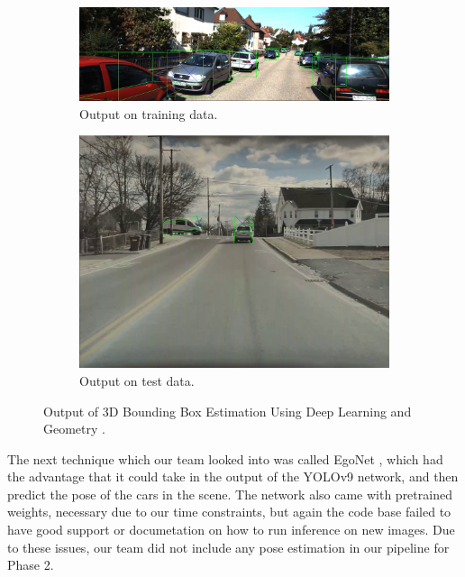 \begin{figure}
    \centering
    \begin{subfigure}{0.95\linewidth}
        \centering
        \includegraphics[width=\textwidth]{images/car_pose_train.png}
        \caption{Output on training data.}
        \label{fig:3DBoxEstimation_output_trained}
    \end{subfigure}
    \begin{subfigure}{0.95\linewidth}
        \centering
        \includegraphics[width=\textwidth]{images/car_pose.png}
        \caption{Output on test data.}
        \label{fig:3DBoxEstimation_output_test}
    \end{subfigure}
    \caption{Output of 3D Bounding Box Estimation Using Deep Learning and Geometry \cite{3DBoxEstimation}.}
\end{figure}

The next technique which our team looked into was called EgoNet \cite{EgoNet}, which had the advantage that it could take in the output of the YOLOv9 network, and then predict the pose of the cars in the scene. The network also came with pretrained weights, necessary due to our time constraints, but again the code base failed to have good support or documetation on how to run inference on new images. Due to these issues, our team did not include any pose estimation in our pipeline for Phase 2.
